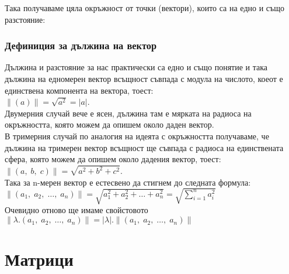 \documentclass[12pt]{article}
\begin{document}
Така получаваме цяла окръжност от точки (вектори), които са на едно и също разстояние: \\


\subsubsection*{Дефиниция за дължина на вектор}

Дължина и разстояние за нас практически са едно и също понятие и така
дължина на едномерен вектор всъщност съвпада с модула на числото, коеот е единствена компонента на вектора, тоест:\\

$\|(a)\| = \sqrt{a^2} = |a|$. \\

Двумерния случай вече е ясен, дължина там е мярката на радиоса на окръжността, която можем да опишем около даден вектор. \\

В тримерния случай по аналогия на идеята с окръжността получаваме, че дължина на тримерен вектор всъщност
ще съвпада с радиоса на единствената сфера, която можем да опишем около дадения вектор, тоест: \\

$\|(a, \; b, \; c)\| = \sqrt{a^2 + b^2 + c^2}$. \\

Така за n-мерен вектор е естесвено да стигнем до следната формула: \\

$\|(a_1, \; a_2, \; \dots, \; a_n)\| = \sqrt{a_1^2 + a_2^2 + \dots + a_n^2} = \displaystyle\sqrt{\displaystyle\sum_{i = 1}^n a_i^2}$ \\

Очевидно отново ще имаме свойстовото $\|\lambda.(a_1, \; a_2, \; \dots, \; a_n)\| = |\lambda|.\|(a_1, \; a_2, \; \dots, \; a_n)\|$

\section*{Матрици}
\end{document}
